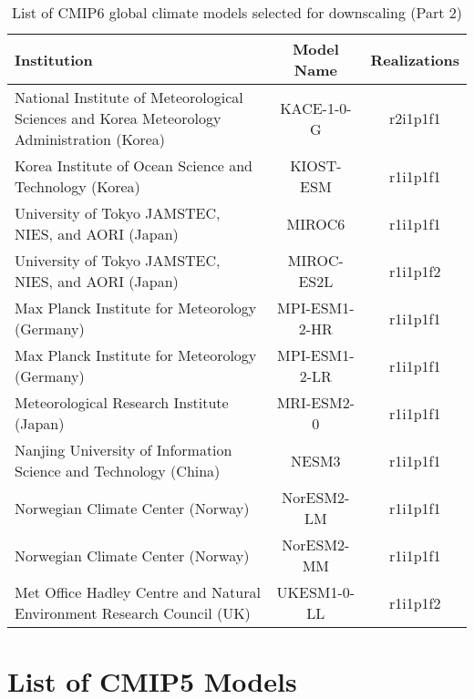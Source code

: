 \documentclass[]{scrartcl}
\begin{document}
\begin{appendices}
\begin{table}[t]
	\caption{List of CMIP6 global climate models selected for downscaling (Part 2)}\label{table:gcm2}
	\begin{center}
		\begin{tabularx}{\linewidth}{|L|cc|} 
			\hline
			\textbf{Institution} & \textbf{Model Name} & \textbf{Realizations}  \\
			\hline
			National Institute of Meteorological Sciences and Korea Meteorology Administration (Korea) & KACE-1-0-G & r2i1p1f1 \\ 
Korea Institute of Ocean Science and Technology (Korea) & KIOST-ESM & r1i1p1f1 \\	
University of Tokyo JAMSTEC, NIES, and AORI (Japan) & MIROC6 & r1i1p1f1 \\
University of Tokyo JAMSTEC, NIES, and AORI (Japan) & MIROC-ES2L & r1i1p1f2 \\  					
Max Planck Institute for Meteorology (Germany) & MPI-ESM1-2-HR & r1i1p1f1 \\
Max Planck Institute for Meteorology (Germany) & MPI-ESM1-2-LR & r1i1p1f1 \\   	
Meteorological Research Institute (Japan) & MRI-ESM2-0 & r1i1p1f1 \\
Nanjing University of Information Science and Technology (China) & NESM3 & r1i1p1f1 \\
Norwegian Climate Center (Norway) & NorESM2-LM & r1i1p1f1 \\
Norwegian Climate Center (Norway) & NorESM2-MM & r1i1p1f1 \\			
Met Office Hadley Centre and \newline Natural Environment Research Council (UK) & UKESM1-0-LL & r1i1p1f2 \\	  	 
			\hline
		\end{tabularx}
	\end{center}
\end{table}

\clearpage

\section{List of CMIP5 Models}\label{cmip5_list}


\end{appendices}
\end{document}
